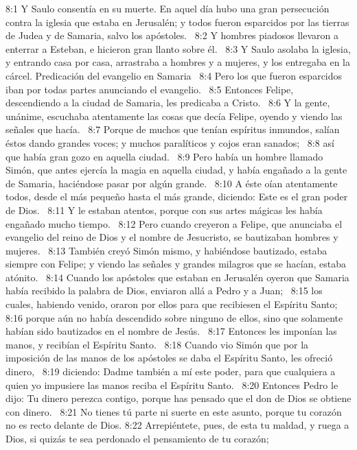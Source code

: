 8:1 Y Saulo consentía en su muerte. En aquel día hubo una gran persecución contra la iglesia que estaba en Jerusalén; y todos fueron esparcidos por las tierras de Judea y de Samaria, salvo los apóstoles.  
8:2 Y hombres piadosos llevaron a enterrar a Esteban, e hicieron gran llanto sobre él.  
8:3 Y Saulo asolaba la iglesia, y entrando casa por casa, arrastraba a hombres y a mujeres, y los entregaba en la cárcel. 
Predicación del evangelio en Samaria  
8:4 Pero los que fueron esparcidos iban por todas partes anunciando el evangelio.  
8:5 Entonces Felipe, descendiendo a la ciudad de Samaria, les predicaba a Cristo.  
8:6 Y la gente, unánime, escuchaba atentamente las cosas que decía Felipe, oyendo y viendo las señales que hacía.  
8:7 Porque de muchos que tenían espíritus inmundos, salían éstos dando grandes voces; y muchos paralíticos y cojos eran sanados;  
8:8 así que había gran gozo en aquella ciudad.  
8:9 Pero había un hombre llamado Simón, que antes ejercía la magia en aquella ciudad, y había engañado a la gente de Samaria, haciéndose pasar por algún grande.  
8:10 A éste oían atentamente todos, desde el más pequeño hasta el más grande, diciendo: Este es el gran poder de Dios.  
8:11 Y le estaban atentos, porque con sus artes mágicas les había engañado mucho tiempo.  
8:12 Pero cuando creyeron a Felipe, que anunciaba el evangelio del reino de Dios y el nombre de Jesucristo, se bautizaban hombres y mujeres.  
8:13 También creyó Simón mismo, y habiéndose bautizado, estaba siempre con Felipe; y viendo las señales y grandes milagros que se hacían, estaba atónito.  
8:14 Cuando los apóstoles que estaban en Jerusalén oyeron que Samaria había recibido la palabra de Dios, enviaron allá a Pedro y a Juan;  
8:15 los cuales, habiendo venido, oraron por ellos para que recibiesen el Espíritu Santo;  
8:16 porque aún no había descendido sobre ninguno de ellos, sino que solamente habían sido bautizados en el nombre de Jesús.  
8:17 Entonces les imponían las manos, y recibían el Espíritu Santo.  
8:18 Cuando vio Simón que por la imposición de las manos de los apóstoles se daba el Espíritu Santo, les ofreció dinero,  
8:19 diciendo: Dadme también a mí este poder, para que cualquiera a quien yo impusiere las manos reciba el Espíritu Santo.  
8:20 Entonces Pedro le dijo: Tu dinero perezca contigo, porque has pensado que el don de Dios se obtiene con dinero.  
8:21 No tienes tú parte ni suerte en este asunto, porque tu corazón no es recto delante de Dios. 
8:22 Arrepiéntete, pues, de esta tu maldad, y ruega a Dios, si quizás te sea perdonado el pensamiento de tu corazón;  
